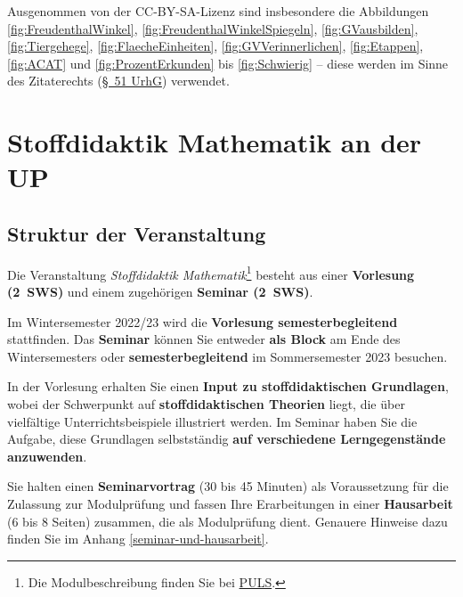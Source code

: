 \documentclass[
]{scrbook}
\theoremstyle{definition}
\theoremstyle{definition}
\theoremstyle{definition}
\theoremstyle{definition}
\theoremstyle{remark}
\begin{document}
Ausgenommen von der CC-BY-SA-Lizenz sind insbesondere die Abbildungen \ref{fig:FreudenthalWinkel}, \ref{fig:FreudenthalWinkelSpiegeln}, \ref{fig:GVausbilden}, \ref{fig:Tiergehege}, \ref{fig:FlaecheEinheiten}, \ref{fig:GVVerinnerlichen}, \ref{fig:Etappen}, \ref{fig:ACAT} und \ref{fig:ProzentErkunden} bis \ref{fig:Schwierig} -- diese werden im Sinne des Zitaterechts (\href{https://www.gesetze-im-internet.de/urhg/__51.html}{§~51 UrhG}) verwendet.

\hypertarget{stoffdidaktik-mathematik-an-der-up}{%
\chapter*{Stoffdidaktik Mathematik an der UP}\label{stoffdidaktik-mathematik-an-der-up}}

\hypertarget{struktur-der-veranstaltung}{%
\section*{Struktur der Veranstaltung}\label{struktur-der-veranstaltung}}

Die Veranstaltung \emph{Stoffdidaktik Mathematik}\footnote{Die Modulbeschreibung finden Sie bei \href{https://puls.uni-potsdam.de/qisserver/rds?state=verpublish\&status=init\&vmfile=no\&moduleCall=modulansicht\&publishConfFile=modulverwaltung\&publishSubDir=up/modulbearbeiter\&\&modul.modul_id=3155\&menuid=\&topitem=Modulbeschreibung\&subitem=}{PULS}.} besteht aus einer \textbf{Vorlesung (2~SWS)} und einem zugehörigen \textbf{Seminar (2~SWS)}.

Im Wintersemester 2022/23 wird die \textbf{Vorlesung semesterbegleitend} stattfinden. Das \textbf{Seminar} können Sie entweder \textbf{als Block} am Ende des Wintersemesters oder \textbf{semesterbegleitend} im Sommersemester 2023 besuchen.

In der Vorlesung erhalten Sie einen \textbf{Input zu stoffdidaktischen Grundlagen}, wobei der Schwerpunkt auf \textbf{stoffdidaktischen Theorien} liegt, die über vielfältige Unterrichtsbeispiele illustriert werden. Im Seminar haben Sie die Aufgabe, diese Grundlagen selbstständig \textbf{auf verschiedene Lerngegenstände anzuwenden}.

Sie halten einen \textbf{Seminarvortrag} (30 bis 45 Minuten) als Voraussetzung für die Zulassung zur Modulprüfung und fassen Ihre Erarbeitungen in einer \textbf{Hausarbeit} (6 bis 8 Seiten) zusammen, die als Modulprüfung dient. Genauere Hinweise dazu finden Sie im Anhang \ref{seminar-und-hausarbeit}.
\end{document}
